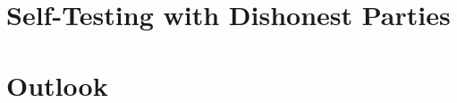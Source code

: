 \documentclass[12pt]{article}
\begin{document}
    
    \section{Self-Testing with Dishonest Parties}
    \label{sec:self-testing-with-dishonest-parties}

    
    \section{Outlook}
    \label{sec:outlook}

    

    \clearpage
    
    
    \label{bib:bibliography}
    
\end{document}
